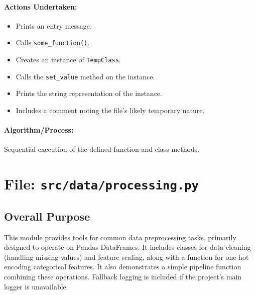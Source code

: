 \documentclass{article}
\begin{document}
\paragraph{Actions Undertaken:}
\begin{itemize}
    \item Prints an entry message.
    \item Calls \texttt{some\_function()}.
    \item Creates an instance of \texttt{TempClass}.
    \item Calls the \texttt{set\_value} method on the instance.
    \item Prints the string representation of the instance.
    \item Includes a comment noting the file's likely temporary nature.
\end{itemize}
\paragraph{Algorithm/Process:} Sequential execution of the defined function and class methods.

\newpage
\section{File: \texttt{src/data/processing.py}}
\subsection{Overall Purpose}
This module provides tools for common data preprocessing tasks, primarily designed to operate on Pandas DataFrames. It includes classes for data cleaning (handling missing values) and feature scaling, along with a function for one-hot encoding categorical features. It also demonstrates a simple pipeline function combining these operations. Fallback logging is included if the project's main logger is unavailable.
\end{document}
